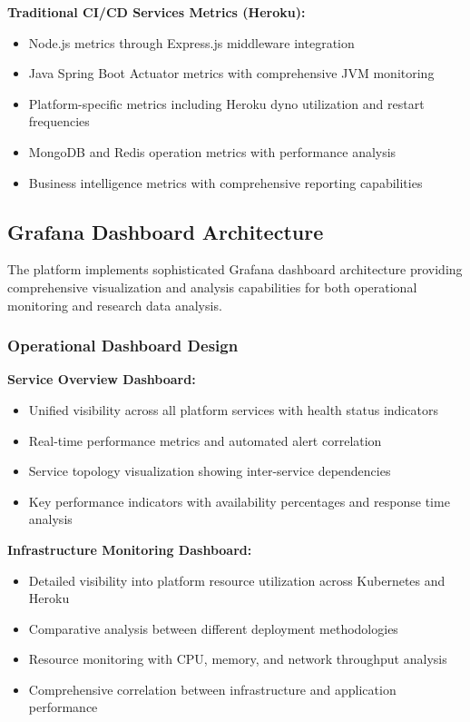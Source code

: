 \textbf{Traditional CI/CD Services Metrics (Heroku):}
\begin{itemize}
\item Node.js metrics through Express.js middleware integration
\item Java Spring Boot Actuator metrics with comprehensive JVM monitoring
\item Platform-specific metrics including Heroku dyno utilization and restart frequencies
\item MongoDB and Redis operation metrics with performance analysis
\item Business intelligence metrics with comprehensive reporting capabilities
\end{itemize}

\subsection{Grafana Dashboard Architecture}

The platform implements sophisticated Grafana dashboard architecture providing comprehensive visualization and analysis capabilities for both operational monitoring and research data analysis.

\subsubsection{Operational Dashboard Design}

\textbf{Service Overview Dashboard:}
\begin{itemize}
\item Unified visibility across all platform services with health status indicators
\item Real-time performance metrics and automated alert correlation
\item Service topology visualization showing inter-service dependencies
\item Key performance indicators with availability percentages and response time analysis
\end{itemize}

\textbf{Infrastructure Monitoring Dashboard:}
\begin{itemize}
\item Detailed visibility into platform resource utilization across Kubernetes and Heroku
\item Comparative analysis between different deployment methodologies
\item Resource monitoring with CPU, memory, and network throughput analysis
\item Comprehensive correlation between infrastructure and application performance
\end{itemize}

